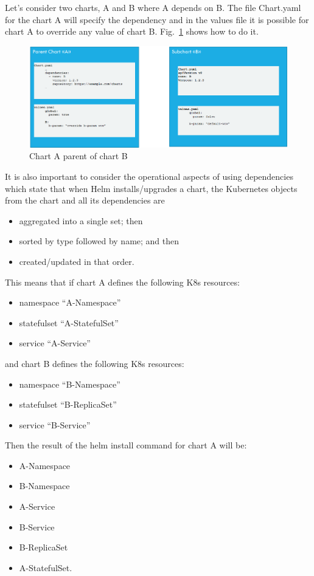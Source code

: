 \documentclass[a4paper]{spie}  %
\begin{document}
Let’s consider two charts, A and B where A depends on B. The file Chart.yaml for the chart A will specify the dependency and in the values file it is possible for chart A to override any value of chart B. Fig.~\ref{fig:a_parent_b} shows how to do it.

\begin{figure}[!htb]
   \centering
   \includegraphics*[width=0.8\columnwidth]{A_parent_B}
   \caption{Chart A parent of chart B}
   \label{fig:a_parent_b}
\end{figure}

It is also important to consider the operational aspects of using dependencies which state that when Helm installs/upgrades a chart, the Kubernetes objects from the chart and all its dependencies are
\begin{itemize}
    \item aggregated into a single set; then
    \item sorted by type followed by name; and then
    \item created/updated in that order.
\end{itemize}
This means that if chart A defines the following K8s resources:
\begin{itemize}
    \item namespace “A-Namespace”
    \item statefulset “A-StatefulSet”
    \item service “A-Service”
\end{itemize}
and chart B defines the following K8s resources:
\begin{itemize}
    \item namespace “B-Namespace”
    \item statefulset “B-ReplicaSet”
    \item service “B-Service”
\end{itemize}
Then the result of the helm install command for chart A will be:
\begin{itemize}
    \item A-Namespace
    \item B-Namespace
    \item A-Service
    \item B-Service
    \item B-ReplicaSet
    \item A-StatefulSet.
\end{itemize}
\end{document}
